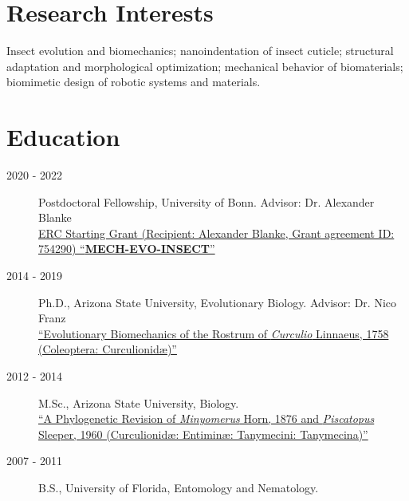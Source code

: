 \documentclass[12pt,a4paper]{article}
\begin{document}
\section*{Research Interests}
	Insect evolution and biomechanics;
	nanoindentation of insect cuticle;
	structural adaptation and morphological optimization;
	mechanical behavior of biomaterials;
	biomimetic design of robotic systems and materials.

\section*{Education}
	\begin{description}
		\item [2020 - 2022] Postdoctoral Fellowship, University of Bonn. Advisor: Dr. Alexander Blanke
		\\ \href{https://cordis.europa.eu/project/id/754290}{ERC Starting Grant (Recipient: Alexander Blanke, Grant agreement ID: 754290) ``\textbf{MECH-EVO-INSECT}''}
		\item [2014 - 2019] Ph.D., Arizona State University, Evolutionary Biology. Advisor: Dr. Nico Franz
		\\ \href{https://repository.asu.edu/items/53836}{``Evolutionary Biomechanics of the Rostrum of \textit{Curculio} Linnaeus, 1758
		(Coleoptera: Curculionid\ae)''}
		\item [2012 - 2014] M.Sc., Arizona State University, Biology.
		\\ \href{https://repository.asu.edu/items/25115}{``A Phylogenetic Revision of \textit{Minyomerus} Horn, 1876 and \textit{Piscatopus} Sleeper, 1960
		(Curculionid\ae: Entimin\ae: Tanymecini: Tanymecina)''}
		\item [2007 - 2011] B.S., University of Florida, Entomology and Nematology.
	\end{description}
\end{document}
